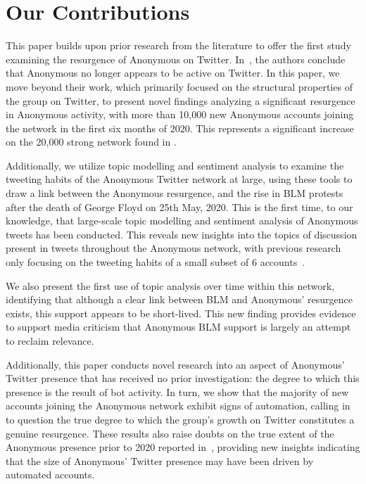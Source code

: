 \documentclass[letterpaper]{article}
\begin{document}
\section{Our Contributions}

This paper builds upon prior research from the literature to offer the first study examining the resurgence of Anonymous on Twitter. In~\citep{Jones2020}, the authors conclude that Anonymous no longer appears to be active on Twitter. In this paper, we move beyond their work, which primarily focused on the structural properties of the group on Twitter, to present novel findings analyzing a significant resurgence in Anonymous activity, with more than 10,000 new Anonymous accounts joining the network in the first six months of 2020. This represents a significant increase on the 20,000 strong network found in \citep{Jones2020}.

Additionally, we utilize topic modelling and sentiment analysis to examine the tweeting habits of the Anonymous Twitter network at large, using these tools to draw a link between the Anonymous resurgence, and the rise in BLM protests after the death of George Floyd on 25th May, 2020. This is the first time, to our knowledge, that large-scale topic modelling and sentiment analysis of Anonymous tweets has been conducted. This reveals new insights into the topics of discussion present in tweets throughout the Anonymous network, with previous research only focusing on the tweeting habits of a small subset of 6 accounts~\cite{Jones2020}.

We also present the first use of topic analysis over time within this network, identifying that although a clear link between BLM and Anonymous' resurgence exists, this support appears to be short-lived. This new finding provides evidence to support media criticism that Anonymous BLM support is largely an attempt to reclaim relevance.

Additionally, this paper conducts novel research into an aspect of Anonymous' Twitter presence that has received no prior investigation: the degree to which this presence is the result of bot activity. In turn, we show that the majority of new accounts joining the Anonymous network exhibit signs of automation, calling in to question the true degree to which the group's growth on Twitter constitutes a genuine resurgence. These results also raise doubts on the true extent of the Anonymous presence prior to 2020 reported in~\cite{Jones2020}, providing new insights indicating that the size of Anonymous' Twitter presence may have been driven by automated accounts.
\end{document}
